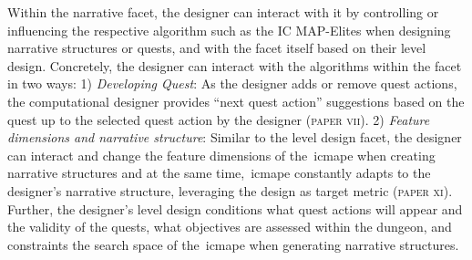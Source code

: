 Within the narrative facet, the designer can interact with it by controlling or influencing the respective algorithm such as the IC MAP-Elites when designing narrative structures or quests, and with the facet itself based on their level design. Concretely, the designer can interact with the algorithms within the facet in two ways: 1) \emph{Developing Quest}: As the designer adds or remove quest actions, the computational designer provides ``next quest action'' suggestions based on the quest up to the selected quest action by the designer (\textsc{paper vii}). 2) \emph{Feature dimensions and narrative structure}: Similar to the level design facet, the designer can interact and change the feature dimensions of the~\acrshort{icmape} when creating narrative structures and at the same time,~\acrshort{icmape} constantly adapts to the designer's narrative structure, leveraging the design as target metric (\textsc{paper xi}). Further, the designer's level design conditions what quest actions will appear and the validity of the quests, what objectives are assessed within the dungeon, and constraints the search space of the~\acrshort{icmape} when generating narrative structures.








